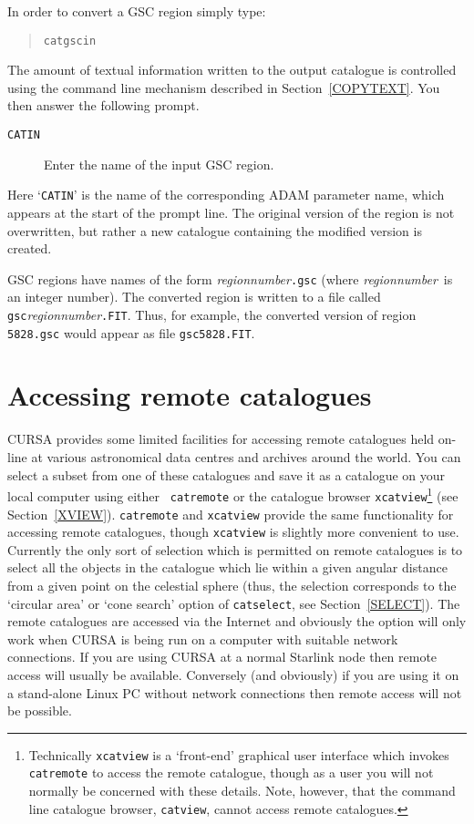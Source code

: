 \documentclass[twoside,11pt]{article}
\newcommand{\xlabel}[1]{}
\renewcommand{\_}{\texttt{\symbol{95}}}
\begin{document}
In order to convert a GSC region simply type:

\begin{verse}
{\tt catgscin}
\end{verse}

The amount of textual
information written to the output catalogue is controlled using the
command line mechanism described in Section~\ref{COPYTEXT}.  
You then answer the following prompt.

\begin{description}

  \item[ {\tt CATIN} ] Enter the name of the input GSC region.

\end{description}

Here `{\tt CATIN}' is the name of the corresponding ADAM parameter name,
which appears at the start of the prompt line.  The original version of
the region is not overwritten, but rather a new catalogue containing the
modified version is created.

GSC regions have names of the form {\it region\_number}{\tt .gsc} (where
{\it region\_number}\, is an integer number).  The converted region is
written to a file called {\tt gsc}{\it region\_number}{\tt .FIT}. Thus,
for example, the converted version of region {\tt 5828.gsc} would appear
as file {\tt gsc5828.FIT}.


\section{\xlabel{REMACCSS}\label{REMACCSS}Accessing remote catalogues}

CURSA provides some limited facilities for accessing remote catalogues
held on-line at various astronomical data centres and archives around
the world.  You can select a subset from one of these catalogues and
save it as a catalogue on your local computer using either {\tt
catremote} or the catalogue browser {\tt xcatview}\footnote{Technically
{\tt xcatview} is a `front-end' graphical user interface which invokes
{\tt catremote} to access the remote catalogue, though as a user you
will not normally be concerned with these details.  Note, however,
that the command line catalogue browser, {\tt catview}, cannot access
remote catalogues.} (see Section~\ref{XVIEW}).  {\tt catremote} and 
{\tt xcatview} provide the same functionality for accessing remote
catalogues, though {\tt xcatview} is slightly more convenient to use.
Currently the only sort of selection which is permitted on remote
catalogues is to select all the objects in the catalogue which lie
within a given angular distance from a given point on the celestial
sphere (thus, the selection corresponds to the `circular area' or
`cone search' option of {\tt catselect}, see Section~\ref{SELECT}).
The remote catalogues are accessed via the Internet and obviously the
option will only work when CURSA is being run on a computer with suitable
network connections.  If you are using CURSA at a normal Starlink node
then remote access will usually be available.  Conversely (and obviously)
if you are using it on a stand-alone Linux PC without network connections
then remote access will not be possible.
\end{document}
